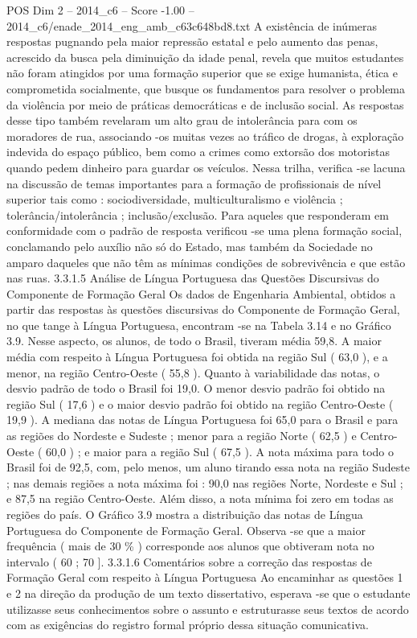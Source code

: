 \begin{textsample}{POS Dim 2 – 2014\_c6 – Score -1.00 – 2014\_c6/enade\_2014\_eng\_amb\_c63c648bd8.txt}
A existência de inúmeras respostas pugnando pela maior repressão estatal e pelo aumento das penas, acrescido da busca pela diminuição da idade penal, revela que muitos estudantes não foram atingidos por uma formação superior que se exige humanista, ética e comprometida socialmente, que busque os fundamentos para resolver o problema da violência por meio de práticas democráticas e de inclusão social.
As respostas desse tipo também revelaram um alto grau de intolerância para com os moradores de rua, associando -os muitas vezes ao tráfico de drogas, à exploração indevida do espaço público, bem como a crimes como extorsão dos motoristas quando pedem dinheiro para guardar os veículos.
Nessa trilha, verifica -se lacuna na discussão de temas importantes para a formação de profissionais de nível superior tais como : sociodiversidade, multiculturalismo e violência ; tolerância/intolerância ; inclusão/exclusão.
Para aqueles que responderam em conformidade com o padrão de resposta verificou -se uma plena formação social, conclamando pelo auxílio não só do Estado, mas também da Sociedade no amparo daqueles que não têm as mínimas condições de sobrevivência e que estão nas ruas. 3.3.1.5 Análise de Língua Portuguesa das Questões Discursivas do Componente de Formação Geral Os dados de Engenharia Ambiental, obtidos a partir das respostas às questões discursivas do Componente de Formação Geral, no que tange à Língua Portuguesa, encontram -se na Tabela 3.14 e no Gráfico 3.9.
Nesse aspecto, os alunos, de todo o Brasil, tiveram média 59,8.
A maior média com respeito à Língua Portuguesa foi obtida na região Sul ( 63,0 ), e a menor, na região Centro-Oeste ( 55,8 ).
Quanto à variabilidade das notas, o desvio padrão de todo o Brasil foi 19,0.
O menor desvio padrão foi obtido na região Sul ( 17,6 ) e o maior desvio padrão foi obtido na região Centro-Oeste ( 19,9 ).
A mediana das notas de Língua Portuguesa foi 65,0 para o Brasil e para as regiões do Nordeste e Sudeste ; menor para a região Norte ( 62,5 ) e Centro-Oeste ( 60,0 ) ; e maior para a região Sul ( 67,5 ).
A nota máxima para todo o Brasil foi de 92,5, com, pelo menos, um aluno tirando essa nota na região Sudeste ; nas demais regiões a nota máxima foi : 90,0 nas regiões Norte, Nordeste e Sul ; e 87,5 na região Centro-Oeste.
Além disso, a nota mínima foi zero em todas as regiões do país.
O Gráfico 3.9 mostra a distribuição das notas de Língua Portuguesa do Componente de Formação Geral.
Observa -se que a maior frequência ( mais de 30 \% ) corresponde aos alunos que obtiveram nota no intervalo ( 60 ; 70 ]. 3.3.1.6 Comentários sobre a correção das respostas de Formação Geral com respeito à Língua Portuguesa Ao encaminhar as questões 1 e 2 na direção da produção de um texto dissertativo, esperava -se que o estudante utilizasse seus conhecimentos sobre o assunto e estruturasse seus textos de acordo com as exigências do registro formal próprio dessa situação comunicativa.

\end{textsample}
